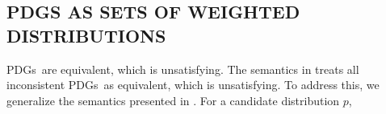 \documentclass{article}
\newcommand{\MN}{PDG}
\newcommand{\MNs}{\MN s}
\numberwithin{equation}{section}
\begin{document}
       	\subsection{\MN S AS SETS OF WEIGHTED DISTRIBUTIONS} \label{sec:weighted-semantics} 
        \MNs\ are equivalent, which is unsatisfying.  
        The semantics in  treats all
        inconsistent \MNs\ as equivalent, which is unsatisfying.  
 	To address this, we generalize the semantics presented in . 
 	For a candidate distribution $p$,
\end{document}
